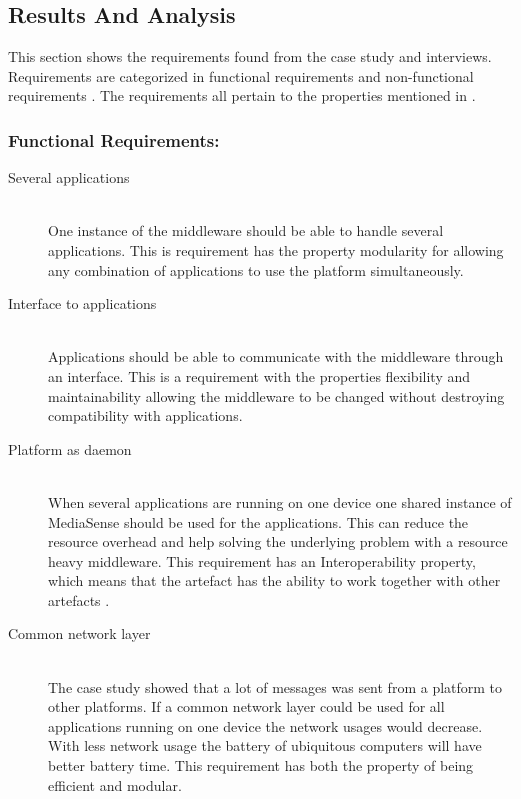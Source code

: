 \subsection{Results And Analysis}
This section shows the requirements found from the case study and interviews. Requirements are categorized in functional requirements and non-functional requirements \cite{Roman1985}. The requirements all pertain to the properties mentioned in \cite{johannesson2012design}. 

\subsubsection{Functional Requirements:}
\begin{description}
	\item[Several applications] \hfill \\
	One instance of the middleware should be able to handle several applications.
	This is requirement has the property modularity for allowing any combination of applications to use the platform simultaneously.
		
	
	\item[Interface to applications] \hfill \\
	Applications should be able to communicate with the middleware through an interface.
	This is a requirement with the properties flexibility and maintainability allowing the middleware to be changed without destroying compatibility with applications.
	
	\item[Platform as daemon] \hfill \\
	When several applications are running on one device one shared instance of MediaSense should be used for the applications. This can reduce the resource overhead and help solving the underlying problem with a resource heavy middleware. This requirement has an Interoperability property, which means that the artefact has the ability to work together with other artefacts \cite{johannesson2012design}. 
	
	\item[Common network layer] \hfill \\
	The case study showed that a lot of messages was sent from a platform to other platforms. If a common network layer could be used for all applications running on one device the network usages would decrease. With less network usage the battery of ubiquitous computers will have better battery time. This requirement has both the property of being efficient and modular. 
	

\end{description}
